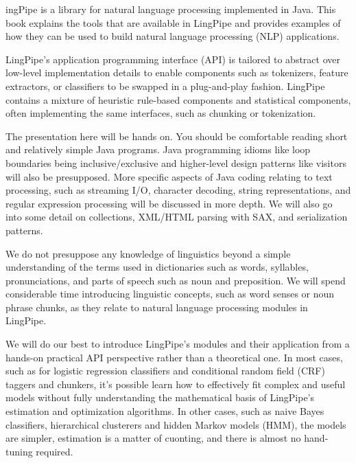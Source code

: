 \clearpage
\fancyhead{}
\fancyfoot{}
\pagestyle{fancy}


\thispagestyle{plain}

ingPipe is a library for natural language processing
implemented in Java.  This book explains the tools that are available
in LingPipe and provides examples of how they can be used to build
natural language processing (NLP) applications.

LingPipe's application programming interface (API) is tailored to
abstract over low-level implementation details to enable components
such as tokenizers, feature extractors, or classifiers to be swapped
in a plug-and-play fashion.  LingPipe contains a mixture of heuristic
rule-based components and statistical components, often implementing
the same interfaces, such as chunking or tokenization.

The presentation here will be hands on.  You should be comfortable
reading short and relatively simple Java programs.  Java programming idioms
like loop boundaries being inclusive/exclusive and higher-level design
patterns like visitors will also be presupposed.  More specific
aspects of Java coding relating to text processing, such as streaming
I/O, character decoding, string representations, and regular
expression processing will be discussed in more depth.  We will also
go into some detail on collections, XML/HTML parsing with SAX, and
serialization patterns.

We do not presuppose any knowledge of linguistics beyond a simple
understanding of the terms used in dictionaries such as words,
syllables, pronunciations, and parts of speech such as noun and
preposition.  We will spend considerable time introducing linguistic
concepts, such as word senses or noun phrase chunks, as they relate to
natural language processing modules in LingPipe.

We will do our best to introduce LingPipe's modules and their
application from a hands-on practical API perspective rather than a
theoretical one.  In most cases, such as for logistic regression
classifiers and conditional random field (CRF) taggers and chunkers,
it's possible learn how to effectively fit complex and useful models
without fully understanding the mathematical basis of LingPipe's
estimation and optimization algorithms.  In other cases, such as naive
Bayes classifiers, hierarchical clusterers and hidden Markov models
(HMM), the models are simpler, estimation is a matter of cuonting,
and there is almost no hand-tuning required.

